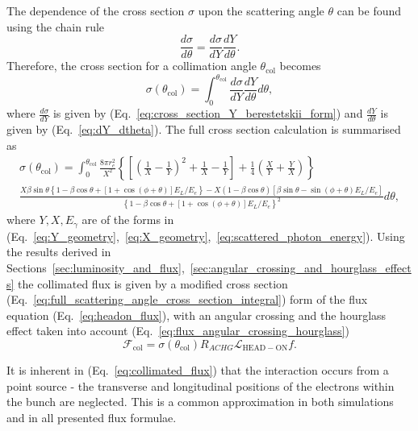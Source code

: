 \documentclass[../main.tex]{subfiles}
\begin{document}
The dependence of the cross section $\sigma$ upon the scattering angle $\theta$ can be found using the chain rule
\begin{equation}
\frac{d\sigma}{d\theta} = \frac{d\sigma}{dY}\frac{dY}{d\theta}.
\label{eq:cross_section_chain_rule}
\end{equation}
Therefore, the cross section for a collimation angle $\theta_{\mathrm{col}}$ becomes
\begin{equation}
\sigma\left(\theta_{\mathrm{col}}\right) = \int_{0}^{\theta_{\mathrm{col}}}\frac{d\sigma}{dY}\frac{dY}{d\theta}d\theta,
\label{eq:cross_section_integral}
\end{equation} 
where $\frac{d\sigma}{dY}$ is given by (Eq.~\ref{eq:cross_section_Y_berestetskii_form}) and $\frac{dY}{d\theta}$ is given by (Eq.~\ref{eq:dY_dtheta}). The full cross section calculation is summarised as
\begin{multline}
\sigma\left(\theta_{\mathrm{col}}\right) = \int_{0}^{\theta_{\mathrm{col}}} \frac{8\pi r_{e}^{2}}{X^{2}}\left\{\left[\left(\frac{1}{X}-\frac{1}{Y}\right)^{2}+\frac{1}{X}-\frac{1}{Y}\right]+\frac{1}{4}\left(\frac{X}{Y}+\frac{Y}{X}\right)\right\}\\\frac{X\beta\sin\theta\left\{1-\beta\cos\theta+\left[1+\cos\left(\phi+\theta\right)\right]E_{L}/E_{e}\right\}-X\left(1-\beta\cos\theta\right)\left[\beta\sin\theta-\sin\left(\phi+\theta\right)E_{L}/E_{e}\right]}{\left\{1-\beta\cos\theta+\left[1+\cos\left(\phi+\theta\right)\right]E_{L}/E_{e}\right\}^{2}}d\theta,
\label{eq:full_scattering_angle_cross_section_integral}
\end{multline}
where $Y, X, E_{\gamma}$ are of the forms in (Eq.~\ref{eq:Y_geometry},~\ref{eq:X_geometry},~\ref{eq:scattered_photon_energy}). Using the results derived in Sections~\ref{sec:luminosity_and_flux},~\ref{sec:angular_crossing_and_hourglass_effects} the collimated flux is given by a modified cross section (Eq.~\ref{eq:full_scattering_angle_cross_section_integral}) form of the flux equation (Eq.~\ref{eq:headon_flux}), with an angular crossing and the  hourglass effect taken into account (Eq.~\ref{eq:flux_angular_crossing_hourglass})
\begin{equation}
\mathcal{F}_{\mathrm{col}} = \sigma\left(\theta_{\mathrm{col}}\right) R_{ACHG}\mathcal{L}_{\mathrm{HEAD-ON}}f.
\label{eq:collimated_flux}
\end{equation}

It is inherent in (Eq.~\ref{eq:collimated_flux}) that the interaction occurs from a point source - the transverse and longitudinal positions of the electrons within the bunch are neglected. This is a common approximation in both simulations and in all presented flux formulae.
\end{document}

